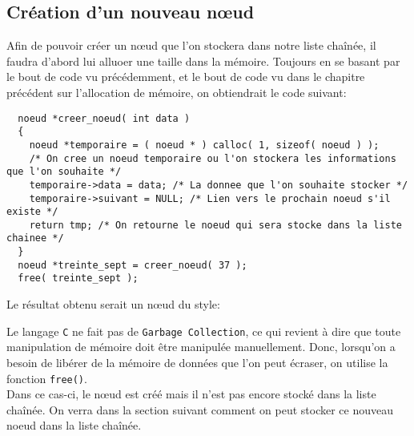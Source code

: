 \documentclass[11pt]{article}
\begin{document}
\subsection{Création d'un nouveau n\oe{}ud}
Afin de pouvoir créer un n\oe{}ud que l'on stockera dans notre liste chaînée, il faudra d'abord lui alluoer une taille dans la mémoire. Toujours en se basant par le bout de code vu précédemment, et le bout de code vu dans le chapitre précédent sur l'allocation de mémoire, on obtiendrait le code suivant:
\begin{lstlisting}
  noeud *creer_noeud( int data )
  {
    noeud *temporaire = ( noeud * ) calloc( 1, sizeof( noeud ) );
    /* On cree un noeud temporaire ou l'on stockera les informations que l'on souhaite */
    temporaire->data = data; /* La donnee que l'on souhaite stocker */
    temporaire->suivant = NULL; /* Lien vers le prochain noeud s'il existe */
    return tmp; /* On retourne le noeud qui sera stocke dans la liste chainee */
  }
  noeud *treinte_sept = creer_noeud( 37 );
  free( treinte_sept );
\end{lstlisting}
Le résultat obtenu serait un n\oe{}ud du style:

Le langage \texttt{C} ne fait pas de \texttt{Garbage Collection}, ce qui revient à dire que toute manipulation de mémoire doit être manipulée manuellement. Donc, lorsqu'on a besoin de libérer de la mémoire de données que l'on peut écraser, on utilise la fonction \texttt{free()}.\\
Dans ce cas-ci, le n\oe{}ud est créé mais il n'est pas encore stocké dans la liste chaînée.
On verra dans la section suivant comment on peut stocker ce nouveau noeud dans la liste chaînée.
\end{document}
